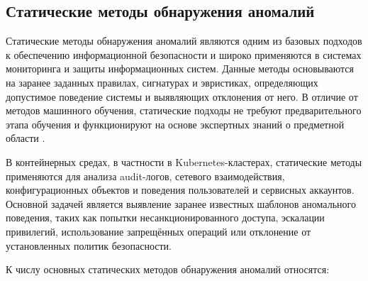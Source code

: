 \subsection{Статические методы обнаружения аномалий}

Статические методы обнаружения аномалий являются одним из базовых подходов к обеспечению информационной безопасности и широко применяются в системах мониторинга и защиты информационных систем. Данные методы основываются на заранее заданных правилах, сигнатурах и эвристиках, определяющих допустимое поведение системы и выявляющих отклонения от него. В отличие от методов машинного обучения, статические подходы не требуют предварительного этапа обучения и функционируют на основе экспертных знаний о предметной области \cite{AD_Survey}.

В контейнерных средах, в частности в Kubernetes-кластерах, статические методы применяются для анализа audit-логов, сетевого взаимодействия, конфигурационных объектов и поведения пользователей и сервисных аккаунтов. Основной задачей является выявление заранее известных шаблонов аномального поведения, таких как попытки несанкционированного доступа, эскалации привилегий, использование запрещённых операций или отклонение от установленных политик безопасности.

К числу основных статических методов обнаружения аномалий относятся:

